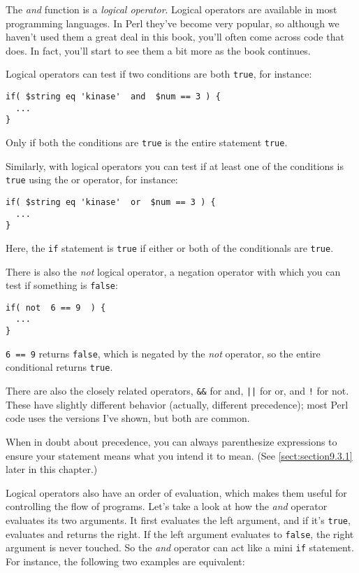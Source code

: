 The \textit{and} function is a \textit{logical operator}. Logical operators are available in most programming languages. In Perl they've become very popular, so although we haven't used them a great deal in this book, you'll often come across code that does. In fact, you'll start to see them a bit more as the book continues.

Logical operators can test if two conditions are both \verb|true|, for instance:

\begin{lstlisting}
if( $string eq 'kinase'  and  $num == 3 ) {
  ...
}
\end{lstlisting}

Only if both the conditions are \verb|true| is the entire statement \verb|true|.

Similarly, with logical operators you can test if at least one of the conditions is \verb|true| using the or operator, for instance: 

\begin{lstlisting}
if( $string eq 'kinase'  or  $num == 3 ) {
  ...
}
\end{lstlisting}

Here, the \verb|if| statement is \verb|true| if either or both of the conditionals are \verb|true|.

There is also the \textit{not} logical operator, a negation operator with which you can test if something is \verb|false|: 

\begin{lstlisting}
if( not  6 == 9  ) {
  ...
}
\end{lstlisting}

\verb|6 == 9| returns \verb|false|, which is negated by the \textit{not} operator, so the entire conditional returns \verb|true|.

There are also the closely related operators, \verb=&&= for and, \verb=||= for or, and \verb=!= for not. These have slightly different behavior (actually, different precedence); most Perl code uses the versions I've shown, but both are common.

When in doubt about precedence, you can always parenthesize expressions to ensure your statement means what you intend it to mean. (See \autoref{sect:section9.3.1} later in this chapter.)

Logical operators also have an order of evaluation, which makes them useful for controlling the flow of programs. Let's take a look at how the \textit{and} operator evaluates its two arguments. It first evaluates the left argument, and if it's \verb|true|, evaluates and returns the right. If the left argument evaluates to \verb|false|, the right argument is never touched.  So the \textit{and} operator can act like a mini \verb|if| statement. For instance, the following two examples are equivalent: 

